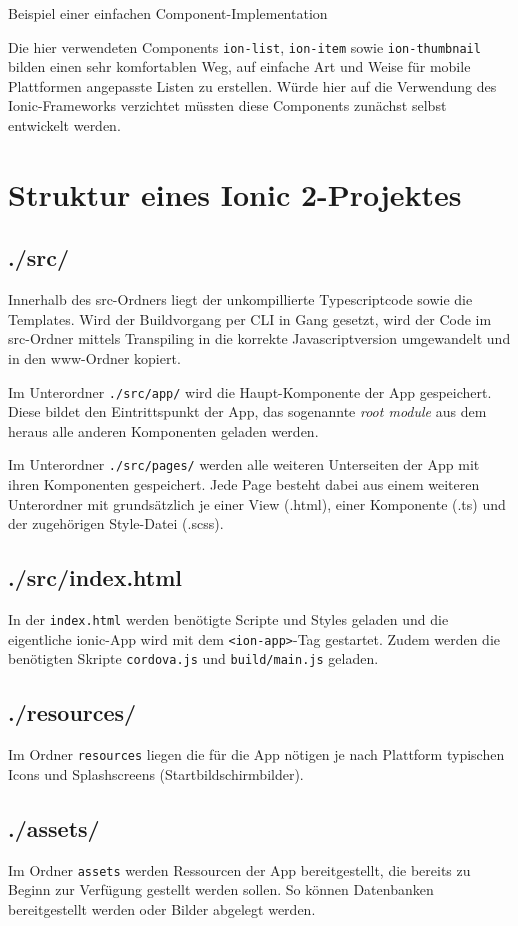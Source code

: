 \begin{listing}[htb]
    
    \caption{Beispiel einer einfachen Component-Implementation}
    \label{lst:ionicExampleTs}
\end{listing}

Die hier verwendeten Components \texttt{ion-list}, \texttt{ion-item} sowie \texttt{ion-thumbnail} bilden einen sehr komfortablen Weg, auf einfache Art und Weise für mobile Plattformen angepasste Listen zu erstellen. Würde hier auf die Verwendung des Ionic-Frameworks verzichtet müssten diese Components zunächst selbst entwickelt werden.
%
%
%

\section{Struktur eines Ionic 2-Projektes} 
\subsection*{./src/}
%
%
Innerhalb des src-Ordners liegt der unkompillierte Typescriptcode sowie die Templates. Wird der Buildvorgang per CLI in Gang gesetzt, wird der Code im src-Ordner mittels Transpiling in die korrekte Javascriptversion umgewandelt und in den www-Ordner kopiert.

Im Unterordner \texttt{./src/app/} wird die Haupt-Komponente der App gespeichert. Diese bildet den Eintrittspunkt der App, das sogenannte \emph{root module} aus dem heraus alle anderen Komponenten geladen werden.

Im Unterordner \texttt{./src/pages/} werden alle weiteren Unterseiten der App mit ihren Komponenten gespeichert. Jede Page besteht dabei aus einem weiteren Unterordner mit grundsätzlich je einer View (.html), einer Komponente (.ts) und der zugehörigen Style-Datei (.scss).
%
\subsection*{./src/index.html}
In der \texttt{index.html} werden benötigte Scripte und Styles geladen und die eigentliche ionic-App wird mit dem \texttt{<ion-app>}-Tag gestartet. Zudem werden die benötigten Skripte \texttt{cordova.js} und \texttt{build/main.js} geladen.
%
\subsection*{./resources/}
Im Ordner \texttt{resources} liegen die für die App nötigen je nach Plattform typischen Icons und Splashscreens (Startbildschirmbilder). 
%
\subsection*{./assets/}
Im Ordner \texttt{assets} werden Ressourcen der App bereitgestellt, die bereits zu Beginn zur Verfügung gestellt werden sollen. So können Datenbanken bereitgestellt werden oder Bilder abgelegt werden.
%
